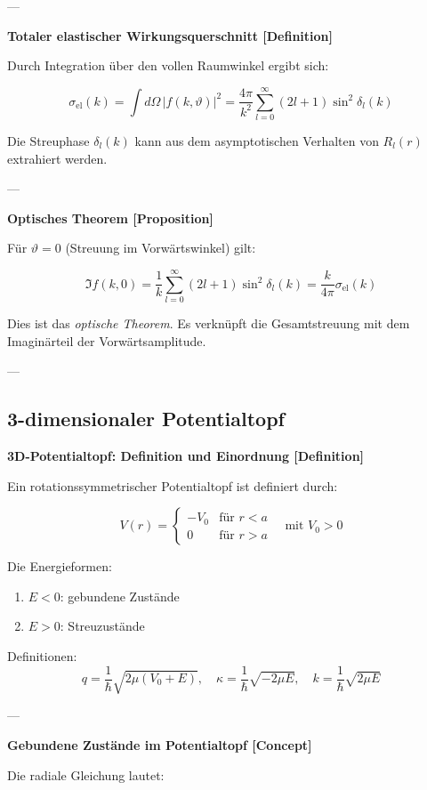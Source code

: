\documentclass[10pt, letterpaper]{article}
\begin{document}
---

\textbf{Totaler elastischer Wirkungsquerschnitt [Definition]}

Durch Integration über den vollen Raumwinkel ergibt sich:

\[
\sigma_{\text{el}}(k) = \int d\Omega \, |f(k, \vartheta)|^2 = \frac{4\pi}{k^2} \sum_{l=0}^\infty (2l+1) \sin^2 \delta_l(k)
\]

Die Streuphase $\delta_l(k)$ kann aus dem asymptotischen Verhalten von $R_l(r)$ extrahiert werden.

---

\textbf{Optisches Theorem [Proposition]}

Für $\vartheta = 0$ (Streuung im Vorwärtswinkel) gilt:

\[
\Im f(k, 0) = \frac{1}{k} \sum_{l=0}^\infty (2l+1) \sin^2 \delta_l(k)
= \frac{k}{4\pi} \sigma_{\text{el}}(k)
\]

Dies ist das \emph{optische Theorem}. Es verknüpft die Gesamtstreuung mit dem Imaginärteil der Vorwärtsamplitude.

---


\pagebreak


\subsection{3-dimensionaler Potentialtopf}

\textbf{3D-Potentialtopf: Definition und Einordnung [Definition]}

Ein rotationssymmetrischer Potentialtopf ist definiert durch:

\[
V(r) = \begin{cases}
-V_0 & \text{für } r < a \\
0    & \text{für } r > a
\end{cases}
\quad \text{mit } V_0 > 0
\]

Die Energieformen:
\begin{enumerate}
  \item $E < 0$: gebundene Zustände
  \item $E > 0$: Streuzustände
\end{enumerate}

Definitionen:
\[
q = \frac{1}{\hbar} \sqrt{2\mu(V_0 + E)}, \quad
\kappa = \frac{1}{\hbar} \sqrt{-2\mu E}, \quad
k = \frac{1}{\hbar} \sqrt{2\mu E}
\]

---

\textbf{Gebundene Zustände im Potentialtopf [Concept]}

Die radiale Gleichung lautet:
\end{document}
